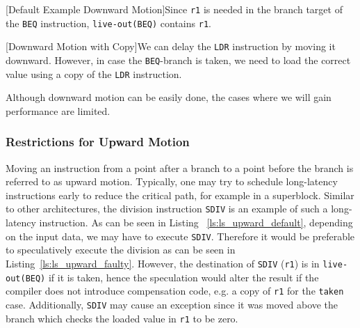 \begin{center}
    \begin{minipage}{.45\textwidth}
        \centering
        \vspace{-1.2cm}
        
        \captionsetup{type=Listing}
        [Default Example Downward Motion]{Since \texttt{r1} is needed in the branch target of the \texttt{BEQ} instruction, \texttt{live-out(BEQ)} contains \texttt{r1}.}
        \label{ls:ls_downward_default}
    \end{minipage}\hfill
    \begin{minipage}{.45\textwidth}
        \centering
        
        \captionsetup{type=Listing}
        [Downward Motion with Copy]{We can delay the \texttt{LDR} instruction by moving it downward. However, in case the \texttt{BEQ}-branch is taken, we need to load the correct value using a copy of the \texttt{LDR} instruction.}
    \end{minipage}
\end{center}

Although downward motion can be easily done, the cases where we will gain performance are limited.

\subsubsection{Restrictions for Upward Motion}
Moving an instruction from a point after a branch to a point before the branch is referred to as upward motion. Typically, one may try to schedule long-latency instructions early to reduce the critical path, for example in a superblock. Similar to other architectures, the division instruction \texttt{SDIV} is an example of such a long-latency instruction. As can be seen in Listing ~\ref{ls:ls_upward_default}, depending on the input data, we may have to execute \texttt{SDIV}. Therefore it would be preferable to speculatively execute the division as can be seen in Listing~\ref{ls:ls_upward_faulty}. However, the destination of \texttt{SDIV} (\texttt{r1}) is in \texttt{live-out(BEQ)} if it is taken, hence the speculation would alter the result if the compiler does not introduce compensation code, e.g. a copy of \texttt{r1} for the \texttt{taken} case. Additionally, \texttt{SDIV} may cause an exception since it was moved above the branch which checks the loaded value in \texttt{r1} to be zero. 

